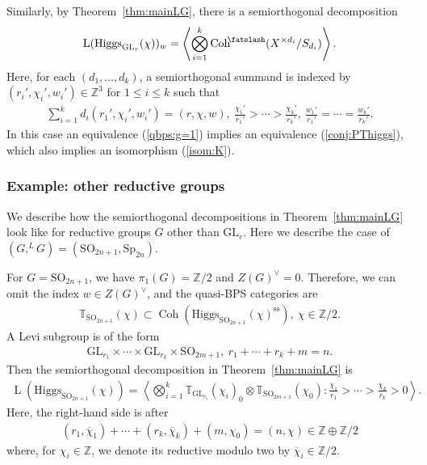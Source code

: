 \documentclass [11pt,oneside,a4paper,mathscr]{amsart}
\theoremstyle{definition}
\renewcommand{\leq}{\leqslant}
\newcommand{\LL}{\operatorname{L}}
\newcommand{\Coh}{\operatorname{Coh}}
\newcommand{\GL}{\operatorname{GL}}
\newcommand{\shear}{{\mathbin{\mkern-6mu\fatslash}}}
\newcommand{\Hig}{\mathrm{Higgs}}
\begin{document}
Similarly, by Theorem~\ref{thm:mainLG}, there is a semiorthogonal decomposition 
\begin{align*}
    \LL(\Hig_{\GL_r}(\chi))_w = 
    \left\langle \bigotimes_{i=1}^k \Coh^{\shear}(X^{\times d_i}/S_{d_i})  \right\rangle. 
\end{align*}
Here, for each $(d_1, \ldots, d_k)$, a semiorthogonal summand is indexed by 
$(r_i', \chi_i', w_i')\in \mathbb{Z}^3$ for $1\leq i\leq k$ such that 
\begin{align*}
    \sum_{i=1}^k d_i(r_1', \chi_i', w_i')=(r, \chi, w), \ 
    \frac{\chi_1'}{r_1'}>\cdots> \frac{\chi_k'}{r_k'}, \ 
    \frac{w_1'}{r_1'}=\cdots=\frac{w_k'}{r_k'}. 
\end{align*}
In this case an equivalence (\ref{qbps:g=1}) implies an equivalence (\ref{conj:PThiggs}), 
which also implies an isomorphism (\ref{isom:K}). 




 \subsubsection{Example: other reductive groups}
We describe how the semiorthogonal decompositions in Theorem~\ref{thm:mainLG}
look like for reductive groups $G$ other than $\mathrm{GL}_r$. 
Here we describe the case of $(G, ^{L}G)=(\mathrm{SO}_{2n+1}, \mathrm{Sp}_{2n})$. 

For $G=\mathrm{SO}_{2n+1}$, we have 
$\pi_1(G)=\mathbb{Z}/2$ and $Z(G)^{\vee}=0$. 
Therefore, we can omit the index $w\in Z(G)^{\vee}$, and the quasi-BPS categories are 
\begin{align*}
    \mathbb{T}_{\mathrm{SO}_{2n+1}}(\chi) \subset \Coh(\Hig_{\mathrm{SO}_{2n+1}}(\chi)^{\mathrm{ss}}), \ \mathbb{\chi}\in \mathbb{Z}/2.
\end{align*}
A Levi subgroup is of the form 
\begin{align*}
\mathrm{GL}_{r_1}\times \cdots \times \mathrm{GL}_{r_k} \times \mathrm{SO}_{2m+1}, \ 
r_1+\cdots+r_k+m=n.
\end{align*}
Then the semiorthogonal decomposition in Theorem~\ref{thm:mainLG} is 
 \begin{align*}
 \LL(\Hig_{\mathrm{SO}_{2n+1}}(\chi))=\left\langle \bigotimes_{i=1}^k \mathbb{T}_{\mathrm{GL}_{r_i}}(\chi_i)_{0} \otimes \mathbb{T}_{\mathrm{SO}_{2m+1}}(\chi_0) : 
 \frac{\chi_1}{r_1}>\cdots>\frac{\chi_k}{r_k}>0
 \right\rangle. 
\end{align*}
 Here, the right-hand side is after 
 \begin{align*}(r_1, \overline{\chi}_1)+\cdots+(r_k, \overline{\chi}_k)+(m, \chi_0)
 =(n, \chi) \in \mathbb{Z}\oplus \mathbb{Z}/2
 \end{align*}
 where, for $\chi_i \in \mathbb{Z}$, we denote its reductive modulo two by $\overline{\chi}_i\in \mathbb{Z}/2$. 
\end{document}
